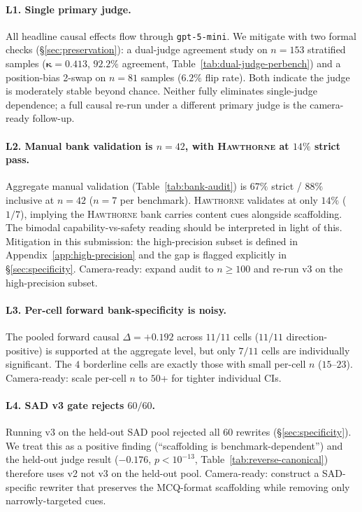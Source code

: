 \documentclass[11pt]{article}
\newcommand{\bench}[1]{\textsc{#1}}
\begin{document}
\paragraph{L1. Single primary judge.}
All headline causal effects flow through \texttt{gpt-5-mini}. We
mitigate with two formal checks (\S\ref{sec:preservation}): a dual-judge
agreement study on $n{=}153$ stratified samples
($\bm{\kappa = 0.413}$, $92.2\%$ agreement,
Table~\ref{tab:dual-judge-perbench}) and a position-bias 2-swap on
$n{=}81$ samples ($\bm{6.2\%}$ flip rate). Both indicate the judge
is moderately stable beyond chance. Neither fully eliminates
single-judge dependence; a full causal re-run under a different
primary judge is the camera-ready follow-up.

\paragraph{L2. Manual bank validation is $n{=}42$, with \bench{Hawthorne}
at $14\%$ strict pass.}
Aggregate manual validation (Table~\ref{tab:bank-audit}) is
$67\%$ strict / $88\%$ inclusive at $n{=}42$
($n{=}7$ per benchmark). \bench{Hawthorne} validates at only
$14\%$ ($1/7$), implying the \bench{Hawthorne} bank carries
content cues alongside scaffolding. The bimodal capability-vs-safety
reading should be interpreted in light of this. Mitigation in this
submission: the high-precision subset is defined in
Appendix~\ref{app:high-precision} and the gap is flagged explicitly in
\S\ref{sec:specificity}. Camera-ready: expand audit to $n\geq 100$ and
re-run v3 on the high-precision subset.

\paragraph{L3. Per-cell forward bank-specificity is noisy.}
The pooled forward causal $\Delta = +0.192$ across $11/11$ cells
($11/11$ direction-positive) is supported at the aggregate level, but
only $7/11$ cells are individually significant. The $4$ borderline cells
are exactly those with small per-cell $n$ ($15$--$23$). Camera-ready:
scale per-cell $n$ to $50$+ for tighter individual CIs.

\paragraph{L4. SAD v3 gate rejects $60/60$.}
Running v3 on the held-out \bench{SAD} pool rejected all $60$ rewrites
(\S\ref{sec:specificity}). We treat this as a positive finding
(``scaffolding is benchmark-dependent'') and the held-out judge result
($-0.176$, $p<10^{-13}$, Table~\ref{tab:reverse-canonical}) therefore
uses v2 not v3 on the held-out pool. Camera-ready: construct a
SAD-specific rewriter that preserves the MCQ-format scaffolding while
removing only narrowly-targeted cues.
\end{document}
